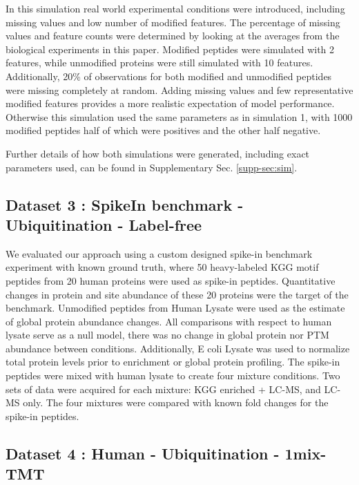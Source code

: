 \documentclass[mcp]{article}
\numberwithin{table}{section}
\begin{document}
In this simulation real world experimental conditions were introduced, including missing values and low number of modified features. The percentage of missing values and feature counts were determined by looking at the averages from the biological experiments in this paper. Modified peptides were simulated with 2 features, while unmodified proteins were still simulated with 10 features. Additionally, 20\% of observations for both modified and unmodified peptides were missing completely at random. Adding missing values and few representative modified features provides a more realistic expectation of model performance. Otherwise this simulation used the same parameters as in simulation 1, with 1000 modified peptides half of which were positives and the other half negative.

Further details of how both simulations were generated, including exact parameters used, can be found in Supplementary Sec. \ref{supp-sec:sim}.
 
\subsection*{Dataset 3 : SpikeIn benchmark - Ubiquitination - Label-free}

We evaluated our approach using a custom designed spike-in benchmark experiment with known ground truth, where 50 heavy-labeled KGG motif peptides from 20 human proteins were used as spike-in peptides. Quantitative changes in protein and site abundance of these 20 proteins were the target of the benchmark.  Unmodified peptides from Human Lysate were used as the estimate of global protein abundance changes. All comparisons with respect to human lysate serve as a null model, there was no change in global protein nor PTM abundance between conditions. Additionally, E coli Lysate was used to normalize total protein levels prior to enrichment or global protein profiling. The spike-in peptides were mixed with human lysate to create four mixture conditions. Two sets of data were acquired for each mixture: KGG enriched + LC-MS, and LC-MS only. The four mixtures were compared with known fold changes for the spike-in peptides.

\subsection*{Dataset 4 : Human - Ubiquitination - 1mix-TMT}
\end{document}
